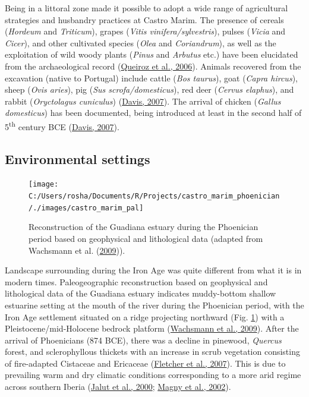 \documentclass[preprint, 3p, authoryear]{elsarticle} %
\begin{document}
Being in a littoral zone made it possible to adopt a wide range of agricultural strategies and husbandry practices at Castro Marim. The presence of cereals (\emph{Hordeum} and \emph{Triticum}), grapes (\emph{Vitis vinifera/sylvestris}), pulses (\emph{Vicia} and \emph{Cicer}), and other cultivated species (\emph{Olea} and \emph{Coriandrum}), as well as the exploitation of wild woody plants (\emph{Pinus} and \emph{Arbutus} etc.) have been elucidated from the archaeological record (\protect\hyperlink{ref-queiroz_etal06}{Queiroz et al., 2006}). Animals recovered from the excavation (native to Portugal) include cattle (\emph{Bos taurus}), goat (\emph{Capra hircus}), sheep (\emph{Ovis aries}), pig (\emph{Sus scrofa/domesticus}), red deer (\emph{Cervus elaphus}), and rabbit (\emph{Oryctolagus cuniculus}) (\protect\hyperlink{ref-davis07}{Davis, 2007}). The arrival of chicken (\emph{Gallus domesticus}) has been documented, being introduced at least in the second half of 5\textsuperscript{th} century BCE (\protect\hyperlink{ref-davis07}{Davis, 2007}).

\hypertarget{environmental-settings}{%
\subsection{Environmental settings}\label{environmental-settings}}



\begin{figure}

{\centering \texttt{[image: C:/Users/rosha/Documents/R/Projects/castro\_marim\_phoenician/./images/castro\_marim\_pal]} 

}

\caption{Reconstruction of the Guadiana estuary during the Phoenician period based on geophysical and lithological data (adapted from Wachsmann et al. (\protect\hyperlink{ref-wachsmann_etal09}{2009})).}\label{fig:castro-marim-pal}
\end{figure}

Landscape surrounding during the Iron Age was quite different from what it is in modern times. Paleogeographic reconstruction based on geophysical and lithological data of the Guadiana estuary indicates muddy-bottom shallow estuarine setting at the mouth of the river during the Phoenician period, with the Iron Age settlement situated on a ridge projecting northward (Fig. \ref{fig:castro-marim-pal}) with a Pleistocene/mid-Holocene bedrock platform (\protect\hyperlink{ref-wachsmann_etal09}{Wachsmann et al., 2009}). After the arrival of Phoenicians (874 BCE), there was a decline in pinewood, \emph{Quercus} forest, and sclerophyllous thickets with an increase in scrub vegetation consisting of fire-adapted Cistaceae and Ericaceae (\protect\hyperlink{ref-fletcher_etal07}{Fletcher et al., 2007}). This is due to prevailing warm and dry climatic conditions corresponding to a more arid regime across southern Iberia (\protect\hyperlink{ref-jalut_etal00}{Jalut et al., 2000}; \protect\hyperlink{ref-magny_etal02}{Magny et al., 2002}).
\end{document}
